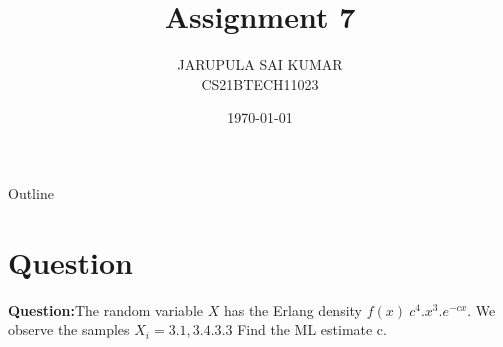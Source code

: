 \documentclass{beamer}
\title{Assignment 7}
\author{JARUPULA SAI KUMAR \\
     CS21BTECH11023 }
\date{\today}
\begin{document}
     \begin{frame}
     \maketitle    
     \end{frame}
     
     \logo{}
     
     \begin{frame}{Outline}
    \tableofcontents
     \end{frame}
      \section{Question}
      \begin{frame}
          

      \textbf{Question:}The random variable $X$ has the Erlang density $f(x)~c^{4}.x^{3}.e^{-cx}$. We observe the samples $X_{i} = 3.1, 3.4.3.3$ Find the ML estimate c.\\
           \end{frame}
           
\end{document}
